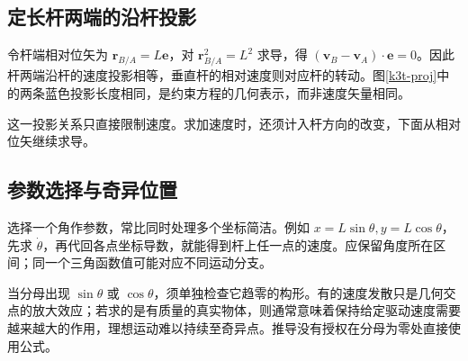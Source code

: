 \subsection{定长杆两端的沿杆投影}
令杆端相对位矢为 $\bm r_{B/A}=L\bm e$，对 $\bm r_{B/A}^2=L^2$ 求导，得 $(\bm v_B-\bm v_A)\cdot\bm e=0$。因此杆两端沿杆的速度投影相等，垂直杆的相对速度则对应杆的转动。图\ref{k3t-proj}中的两条蓝色投影长度相同，是约束方程的几何表示，而非速度矢量相同。

这一投影关系只直接限制速度。求加速度时，还须计入杆方向的改变，下面从相对位矢继续求导。

\subsection{参数选择与奇异位置}
选择一个角作参数，常比同时处理多个坐标简洁。例如 $x=L\sin\theta,y=L\cos\theta$，先求 $\dot\theta$，再代回各点坐标导数，就能得到杆上任一点的速度。应保留角度所在区间；同一个三角函数值可能对应不同运动分支。

当分母出现 $\sin\theta$ 或 $\cos\theta$，须单独检查它趋零的构形。有的速度发散只是几何交点的放大效应；若求的是有质量的真实物体，则通常意味着保持给定驱动速度需要越来越大的作用，理想运动难以持续至奇异点。推导没有授权在分母为零处直接使用公式。

